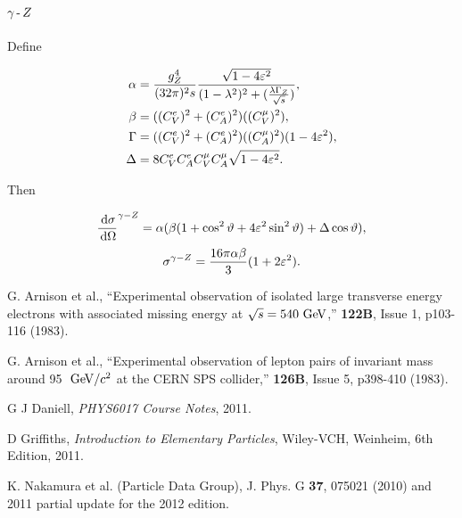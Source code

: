 \documentclass[]{article}
\begin{document}
\subsection{$\gamma\operatorname{-}Z $}

Define

\begin{align*}
\alpha &= \frac{g_{\Zzero}^{4}}{(32\pi)^{2}s} \frac{\sqrt{1-4\varepsilon^{2}}}{(1-\lambda^{2})^{2} + (\frac{\lambda\GZ}{\rts})},
\\
\beta &= ((C_{V}^{e})^{2} + (C_{A}^{e})^{2})((C_{V}^{\mu})^{2}),
\\
\Gamma &= ((C_{V}^{e})^{2} + (C_{A}^{e})^{2})((C_{A}^{\mu})^{2})(1-4\varepsilon^{2}),
\\
\Delta &= 8C_{V}^{e}C_{A}^{e}C_{V}^{\mu}C_{A}^{\mu}\sqrt{1-4\varepsilon^{2}}.
\end{align*}

Then

$$
\frac{\,\operatorname{d}\!{\sigma}}{\,\operatorname{d}\!{\Omega}}^{\gamma-Z }
  = \alpha(\beta(1+\cos^{2}{\vartheta}+4\varepsilon^{2}\sin^{2}{\vartheta})
    + \Delta\cos{\vartheta}
  ),
$$
\begin{equation}
\sigma^{\gamma-\Zzero} = \frac{16\pi\alpha\beta}{3}(1 + 2\varepsilon^{2}).
\end{equation}

\begin{thebibliography}{9}
  G. Arnison et al.,
  ``Experimental observation of isolated large transverse energy electrons with associated missing energy at $\sqrt{s}=540\GeV$,''
  \emph{\PL}\textbf{122B},
  Issue 1,
  p103-116 (1983).
  
  G. Arnison et al.,
  ``Experimental observation of lepton pairs of invariant mass around 95 $\GeV/c^{2}$ at the CERN SPS collider,''
  \emph{\PL}\textbf{126B},
  Issue 5,
  p398-410 (1983).

  G J Daniell,
  \emph{PHYS6017 Course Notes},
  2011.
  
  D Griffiths,
  \emph{Introduction to Elementary Particles},
  Wiley-VCH, Weinheim,
  6th Edition,
  2011.
  
  K. Nakamura et al. (Particle Data Group),
  J.{} Phys.{} G \textbf{37},
  075021 (2010) and 2011 partial update for the 2012 edition.
\end{thebibliography}
 
\end{document}
